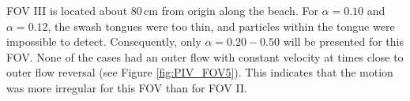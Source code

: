 \documentclass[review, authoryear]{elsarticle}
\newcommand{\cm}{\,\mbox{cm}}
\begin{document}
 FOV III is located about $80\cm$ from origin along the beach. For $\alpha=0.10$ and $\alpha=0.12$, the swash tongues were too thin, and particles within the tongue were impossible to detect. Consequently, only $\alpha=0.20-0.50$ will be presented for this FOV. None of the cases had an outer flow with constant velocity at times close to outer flow reversal (see Figure \ref{fig:PIV_FOV5}). This indicates that the motion was more irregular for this FOV than for FOV II.
 \begin{figure}[]
\centering
{}
\end{figure}
\end{document}
